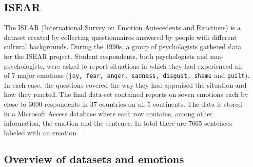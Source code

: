 \documentclass[11pt]{article}
\begin{document}
\subsection{ISEAR}
\label{sec:data:isear}
The ISEAR (International Survey on Emotion Antecedents and Reactions) is a dataset created by collecting questionnaires answered by people with different cultural backgrounds.   
During the 1990s, a group of psychologists gathered data for the ISEAR project. Student respondents, both psychologists and non-psychologists, were asked to report situations in which they had experienced all of 7 major emotions (\texttt{joy, fear, anger, sadness, disgust, shame} and \texttt {guilt}). In each case, the questions covered the way they had appraised the situation and how they reacted. The final data-set contained reports on seven emotions each by close to 3000 respondents in 37 countries on all 5 continents.
The data is stored in a Microsoft Access database where each row contains, among other information, the emotion and the sentence. In total there are 7665 sentences labeled with an emotion. 










\subsection{Overview of datasets and emotions}
\label{sec:overview}
\end{document}
